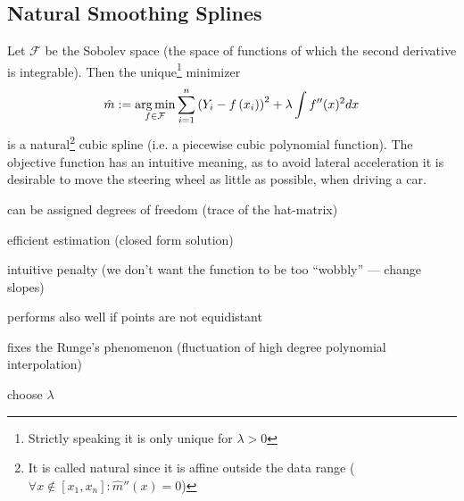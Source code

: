 \subsection{Natural Smoothing Splines}
\label{sec:Natural}
Let $\mathcal F$ be the Sobolev space (the space of functions of which the second derivative is integrable). Then the unique\footnote{Strictly speaking it is only unique for $\lambda > 0$} minimizer
$$\hat m :=\operatorname*{arg\, min}_{f \in \mathcal F} \sum_{i=1}^{n}\left(Y_{i}-{f}\left(x_{i}\right)\right)^{2}+\lambda \int {f}^{\prime \prime}(x)^{2} d x$$
is a natural\footnote{It is called natural since it is affine outside the data range ($\forall x\notin [x_1, x_n]:\hat m''(x) = 0$)} cubic spline (i.e. a piecewise cubic polynomial function).
The objective function has an intuitive meaning, as to avoid lateral acceleration it is desirable to move the steering wheel as little as possible, when driving a car.


\begin{my_pros_cons_table}{
    \item can be assigned degrees of freedom (trace of the hat-matrix)
    \item efficient estimation (closed form solution)
    \item intuitive penalty (we don't want the function to be too ``wobbly'' --- change slopes)
    \item performs also well if points are not equidistant
    \item fixes the Runge's phenomenon (fluctuation of high degree polynomial interpolation)
  }{
    \item choose $\lambda$
  }
\end{my_pros_cons_table}





